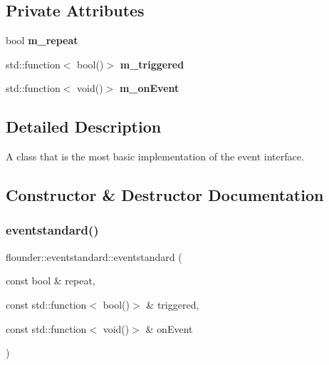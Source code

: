 \subsection*{Private Attributes}
\begin{DoxyCompactItemize}
\item 
\mbox{\label{classflounder_1_1eventstandard_a32fe9df9224d30665a3052d4f84dfc7d}} 
bool {\bfseries m\+\_\+repeat}
\item 
\mbox{\label{classflounder_1_1eventstandard_a5cfe152a10b4bb997e0f95b22ba7fc9e}} 
std\+::function$<$ bool()$>$ {\bfseries m\+\_\+triggered}
\item 
\mbox{\label{classflounder_1_1eventstandard_a9d5030d3ce4419af226b1330c3b771c5}} 
std\+::function$<$ void()$>$ {\bfseries m\+\_\+on\+Event}
\end{DoxyCompactItemize}


\subsection{Detailed Description}
A class that is the most basic implementation of the event interface. 



\subsection{Constructor \& Destructor Documentation}
\mbox{\label{classflounder_1_1eventstandard_a39d75790b90c11dee6a982f7ffeabebe}} 
\subsubsection{\texorpdfstring{eventstandard()}{eventstandard()}\hspace{0.1cm}{\footnotesize\ttfamily [1/2]}}
{\footnotesize\ttfamily flounder\+::eventstandard\+::eventstandard (\begin{DoxyParamCaption}\item[{const bool \&}]{repeat,  }\item[{const std\+::function$<$ bool()$>$ \&}]{triggered,  }\item[{const std\+::function$<$ void()$>$ \&}]{on\+Event }\end{DoxyParamCaption})}




